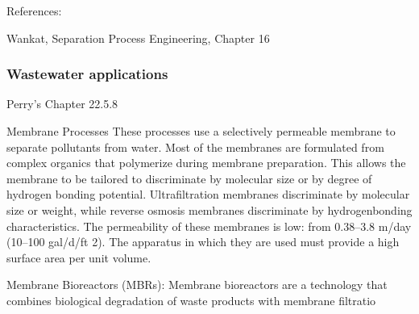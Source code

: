 
References:

Wankat, Separation Process Engineering, Chapter 16


\begin{frame}\frametitle{Wastewater applications}
	Perry's Chapter 22.5.8
	
	Membrane Processes These processes use a selectively permeable membrane to separate pollutants from water. Most of the membranes are formulated from complex organics that polymerize during membrane preparation. This allows the membrane to be tailored to discriminate by molecular size or by degree of hydrogen bonding potential. Ultrafiltration membranes discriminate by molecular size or weight, while reverse osmosis membranes discriminate by hydrogenbonding characteristics. The permeability of these membranes is low: from 0.38–3.8 m/day (10–100 gal/d/ft 2). The apparatus in which they are used must provide a high surface area per unit volume.

	Membrane Bioreactors (MBRs): Membrane bioreactors are a technology that combines biological degradation of waste products with membrane filtratio
\end{frame}